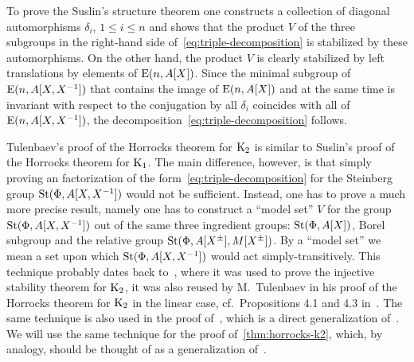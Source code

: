To prove the Suslin's structure theorem one constructs a collection of diagonal automorphisms $\delta_i$, $1\leq i\leq n$
 and shows that the product $V$ of the three subgroups in the right-hand side of~\eqref{eq:triple-decomposition} is stabilized by these automorphisms.
On the other hand, the product $V$ is clearly stabilized by left translations by elements of $\operatorname{E}(n, A[X])$.
Since the minimal subgroup of $\operatorname{E}(n, A[X, X^{-1}])$ that contains the image of $\operatorname{E}(n, A[X])$ and at the same time is invariant with respect to the conjugation by all $\delta_i$
  coincides with all of $\operatorname{E}(n, A[X, X^{-1}])$, the decomposition~\eqref{eq:triple-decomposition} follows.

Tulenbaev's proof of the Horrocks theorem for $\operatorname{K}_2$ is similar to Suslin's proof of the Horrocks theorem for $\operatorname{K}_1$.
The main difference, however, is that simply proving an factorization of the form~\eqref{eq:triple-decomposition} for the Steinberg group $\operatorname{St}(\Phi, A[X, X^{-1}])$
 would not be sufficient.
Instead, one has to prove a much more precise result, namely one has to construct a ``model set'' $V$ for the group $\operatorname{St}(\Phi, A[X, X^{-1}])$
 out of the same three ingredient groups: $\operatorname{St}(\Phi, A[X])$, Borel subgroup and the relative group $\operatorname{St}(\Phi, A[X^\pm], M[X^\pm])$.
By a ``model set'' we mean a set upon which $\operatorname{St}(\Phi, A[X, X^{-1}])$ would act simply-transitively.
This technique probably dates back to~\cite{ST76}, where it was used to prove the injective stability theorem for $\operatorname{K}_2$, it was also reused
 by M.~Tulenbaev in his proof of the Horrocks theorem for $\operatorname{K}_2$ in the linear case, cf.\ Propositions 4.1 and 4.3 in~\cite{Tu83}.
The same technique is also used in the proof of~\cite[Theorem~3]{LS20}, which is a direct generalization of~\cite[Proposition~4.3]{Tu83}.
We will use the same technique for the proof of~\cref{thm:horrocks-k2}, which, by analogy, should be thought of as a generalization of~\cite[Proposition~4.1]{Tu83}.

